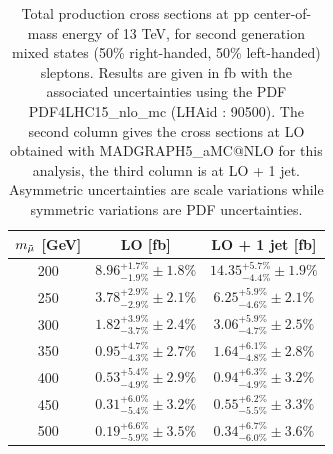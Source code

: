 \documentclass{cernatlasnote}
\begin{document}
\begin{appendices}
\begin{table}
    \centering
    \caption{Total production cross sections at pp center-of-mass energy of 13 TeV, for second generation mixed states (50\% right-handed, 50\% left-handed) sleptons. Results are given in fb with the associated uncertainties using the PDF PDF4LHC15\_nlo\_mc (LHAid : 90500). The second column gives the cross sections at LO obtained with MADGRAPH5\_aMC@NLO for this analysis, the third column is at LO + 1 jet. Asymmetric uncertainties are scale variations while symmetric variations are PDF uncertainties.} 
    \label{tab:RLLRXS}
    \smallskip
    \begin{tabular}{ ccc }
         $m_{\Tilde{\mu}}$ [GeV] &  LO [fb] & LO + 1 jet [fb]\\
         \hline
         200  & $8.96^{+1.7\%}_{-1.9\%} \pm 1.8\%$ & $14.35^{+5.7\%}_{-4.4\%} \pm 1.9\%$ \\
         250   & $3.78^{+2.9\%}_{-2.9\%} \pm 2.1\%$ & $6.25^{+5.9\%}_{-4.6\%} \pm 2.1\%$\\
         300  & $1.82^{+3.9\%}_{-3.7\%} \pm 2.4\%$ &  $3.06^{+5.9\%}_{-4.7\%} \pm 2.5\%$\\
         350 &  $0.95^{+4.7\%}_{-4.3\%} \pm 2.7\%$ &  $1.64^{+6.1\%}_{-4.8\%} \pm 2.8\%$\\
         400  & $0.53^{+5.4\%}_{-4.9\%} \pm 2.9\%$ & $0.94^{+6.3\%}_{-4.9\%} \pm 3.2\%$\\
         450  & $0.31^{+6.0\%}_{-5.4\%} \pm 3.2\%$ & $0.55^{+6.2\%}_{-5.5\%} \pm 3.3\%$\\
         500  & $0.19^{+6.6\%}_{-5.9\%} \pm 3.5\%$ & $0.34^{+6.7\%}_{-6.0\%} \pm 3.6\%$\\
    \end{tabular}
\end{table}


\end{appendices}
\end{document}
